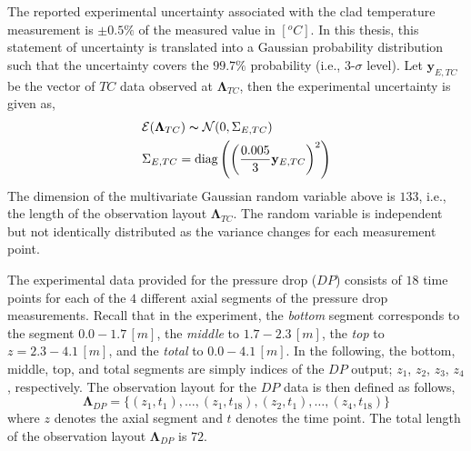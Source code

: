The reported experimental uncertainty associated with the clad temperature measurement is $\pm0.5\%$ of the measured value in $[^oC]$.
In this thesis, this statement of uncertainty is translated into a Gaussian probability distribution such that the uncertainty covers the $99.7\%$ probability (i.e., $3$-$\sigma$ level).
Let $\mathbf{y}_{E,TC}$ be the vector of $TC$ data observed at $\boldsymbol{\Lambda}_{TC}$, then the experimental uncertainty is given as,
\begin{equation}
	\begin{split}
		& \mathcal{E}(\boldsymbol{\Lambda}_{TC}) \thicksim \mathcal{N}(0, \Sigma_{E,TC})\\
		& \Sigma_{E,TC} = \text{diag}\left(\left(\frac{0.005}{3}\mathbf{y}_{E,TC}\right)^2\right)
	\end{split}	
\label{eq:bc_experimental_uncertainty_feba_tc}
\end{equation}
The dimension of the multivariate Gaussian random variable above is $133$, i.e., the length of the observation layout $\boldsymbol{\Lambda}_{TC}$.
The random variable is independent but not identically distributed as the variance changes for each measurement point.

The experimental data provided for the pressure drop ($DP$) consists of $18$ time points for each of the $4$ different axial segments of the pressure drop measurements.
Recall that in the experiment, the \emph{bottom} segment corresponds to the segment $0.0 - 1.7\,[m]$, the \emph{middle} to $1.7 - 2.3\,[m]$, the \emph{top} to $z = 2.3 - 4.1\,[m]$, and the \emph{total} to $0.0 - 4.1\,[m]$.
In the following, the bottom, middle, top, and total segments are simply indices of the $DP$ output; $z_1$, $z_2$, $z_3$, $z_4$, respectively.
The observation layout for the $DP$ data is then defined as follows,
\begin{equation}
		\boldsymbol{\Lambda}_{DP} = \{(z_1,t_1),\ldots,(z_1,t_{18}),(z_2,t_1),\ldots,(z_4,t_{18})\}
\label{eq:bc_observation_layout_feba_dp}
\end{equation}
where $z$ denotes the axial segment and $t$ denotes the time point.
The total length of the observation layout $\boldsymbol{\Lambda}_{DP}$ is $72$.
 
